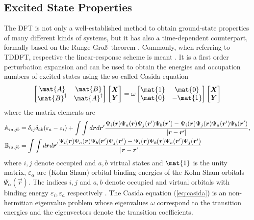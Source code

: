 \subsection{Excited State Properties}
\label{ch:tddft}
The DFT is not only a well-established method to obtain ground-state properties of many different kinds of systems, but it has also a time-dependent counterpart, formally based on the Runge-Gro\ss\, theorem \cite{RungeGross}.
Commonly, when referring to TDDFT, respective the linear-response scheme is meant \cite{dreuw}.
It is a first order perturbation expansion and can be used to obtain the energies and occupation numbers of excited states using the so-called Casida-equation \cite{casida}
\begin{equation} \label{eq:casida}
\begin{bmatrix} \mat{A} & \mat{B} \\ \mat{B}^\dagger & \mat{A}^\dagger\end{bmatrix}
\begin{bmatrix} \vec{X} \\ \vec{Y} \end{bmatrix} =
\omega \begin{bmatrix} \mat{1} & \mat{0} \\ \mat{0} & -\mat{1}\end{bmatrix}
\begin{bmatrix} \vec{X} \\ \vec{Y} \end{bmatrix}
\end{equation}
where the matrix elements are
\begin{align}
\mathbb{A}_{ia,jb}& =\delta_{ij}\delta_{ab}(\varepsilon_a-\varepsilon_i)+ 
\int \int d\bm{r} d\bm{r}'\frac{ \Psi_i(\bm{r}) \Psi_a(\bm{r})  \Psi_j(\bm{r}') \Psi_b(\bm{r}')- 
\Psi_i(\bm{r}) \Psi_j(\bm{r}) \Psi_a(\bm{r}') \Psi_b(\bm{r}')}{|\bm{r}-\bm{r}'|} ,\\
\mathbb{B}_{ia,jb}& = \int \int d\bm{r} d\bm{r}'\frac{\Psi_i(\bm{r}) \Psi_a(\bm{r})  \Psi_b(\bm{r}') \Psi_j(\bm{r}')- 
\Psi_i(\bm{r}) \Psi_b(\bm{r})  \Psi_a(\bm{r}') \Psi_j(\bm{r}')}{|\bm{r}-\bm{r}'|}
\end{align}
where $i,j$ denote occupied and $a,b$ virtual states and $\mat{1}$ is the unity matrix, $\varepsilon_\alpha$ are (Kohn-Sham) orbital binding energies of the Kohn-Sham orbitals $\Psi_\alpha(\vec{r})$.
The indices $i,j$ and $a,b$ denote occupied and virtual orbitals with binding energy $\varepsilon_i, \varepsilon_a$ respectively \cite{dreuw}.
The Casida equation (\ref{eq:casida}) is an non-hermitian eigenvalue problem whose eigenvalues $\omega$ correspond to the transition energies and the eigenvectors denote the transition coefficients.
